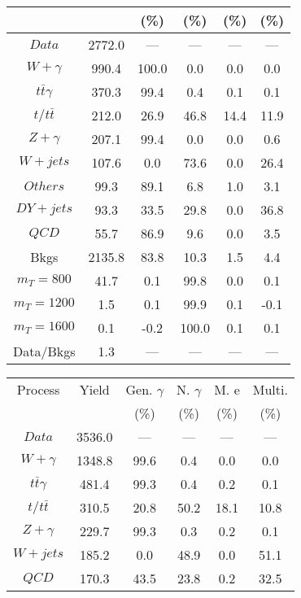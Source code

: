 \begin{figure}
\begin{minipage}[c]{0.32\textwidth}
{\begin{tabular}{cccccc}
 &  & (\%) & (\%) & (\%) & (\%)  \\
\hline
                                                                      $ Data $ &  2772.0 &  --- &  --- &  --- &  ---\\
$ W+\gamma $ &  990.4 &  100.0 &  0.0 &  0.0 &  0.0\\
$ t\bar{t}\gamma $ &  370.3 &  99.4 &  0.4 &  0.1 &  0.1\\
$ t/t\bar{t} $ &  212.0 &  26.9 &  46.8 &  14.4 &  11.9\\
$ Z+\gamma $ &  207.1 &  99.4 &  0.0 &  0.0 &  0.6\\
$ W+jets $ &  107.6 &  0.0 &  73.6 &  0.0 &  26.4\\
$ Others $ &  99.3 &  89.1 &  6.8 &  1.0 &  3.1\\
$ DY+jets $ &  93.3 &  33.5 &  29.8 &  0.0 &  36.8\\
$ QCD $ &  55.7 &  86.9 &  9.6 &  0.0 &  3.5\\
Bkgs &  2135.8 &  83.8 &  10.3 &  1.5 &  4.4\\
$ m_{T} = 800 $ &  41.7 &  0.1 &  99.8 &  0.0 &  0.1\\
$ m_{T} = 1200 $ &  1.5 &  0.1 &  99.9 &  0.1 &  -0.1\\
$ m_{T} = 1600 $ &  0.1 &  -0.2 &  100.0 &  0.1 &  0.1\\
Data/Bkgs &  1.3 &  --- &  --- &  --- &  ---\\
\hline
\end{tabular}
}
\end{minipage}
\begin{minipage}[c]{0.32\textwidth}
\centering
\tiny{
\begin{tabular}{cccccc}
\hline
Process & Yield & Gen. $\gamma$ & N. $\gamma$ & M. e & Multi. \\
 &  & (\%) & (\%) & (\%) & (\%)  \\
\hline
                                                                      $ Data $ &  3536.0 &  --- &  --- &  --- &  ---\\
$ W+\gamma $ &  1348.8 &  99.6 &  0.4 &  0.0 &  0.0\\
$ t\bar{t}\gamma $ &  481.4 &  99.3 &  0.4 &  0.2 &  0.1\\
$ t/t\bar{t} $ &  310.5 &  20.8 &  50.2 &  18.1 &  10.8\\
$ Z+\gamma $ &  229.7 &  99.3 &  0.3 &  0.2 &  0.1\\
$ W+jets $ &  185.2 &  0.0 &  48.9 &  0.0 &  51.1\\
$ QCD $ &  170.3 &  43.5 &  23.8 &  0.2 &  32.5\\

\end{tabular}}
\end{minipage}
\end{figure}
